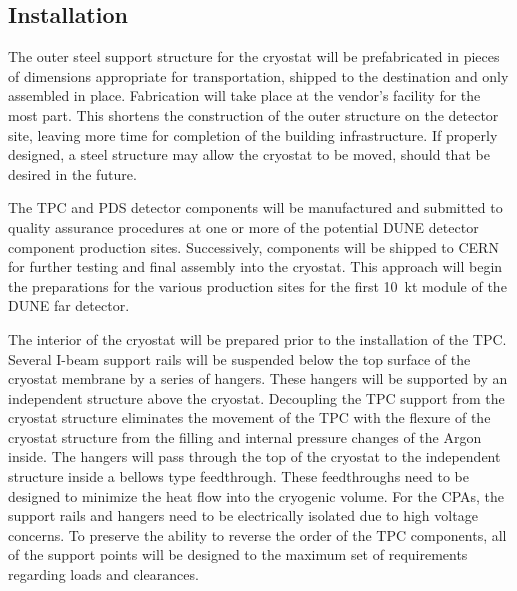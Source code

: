 



%

\subsection{Installation}

The outer steel support structure for the cryostat will be prefabricated in pieces of dimensions appropriate for transportation, shipped to the destination and only assembled in place.  Fabrication will take place at the vendor's facility for the most part. This shortens the construction of the outer structure on the detector site, leaving more time for completion of the building infrastructure. If properly designed, a steel structure may allow the cryostat to be moved, should that be desired in the future.

The TPC and PDS detector components will be manufactured and submitted to quality assurance procedures at one or more of the potential DUNE detector component production sites. Successively, components will be shipped to CERN for further testing and final assembly into the cryostat. This approach will begin the preparations for the various production sites for the first 10~kt module of the DUNE far detector.

The interior of the cryostat will be prepared prior to the installation of the TPC.  Several I-beam support rails will be suspended below the top surface of the cryostat membrane by a series of hangers.  These hangers will be supported by an independent structure above the cryostat.  Decoupling the TPC support from the cryostat structure eliminates the movement of the TPC with the flexure of the cryostat structure from the filling and internal pressure changes of the Argon inside.  The hangers will pass through the top of the cryostat to the independent structure inside a bellows type feedthrough.  These feedthroughs need to be designed to minimize the heat flow into the cryogenic volume.  For the CPAs, the support rails and hangers need to be electrically isolated due to high voltage concerns.  To preserve the ability to reverse the order of the TPC components, all of the support points will be designed to the maximum set of requirements regarding loads and clearances.  


